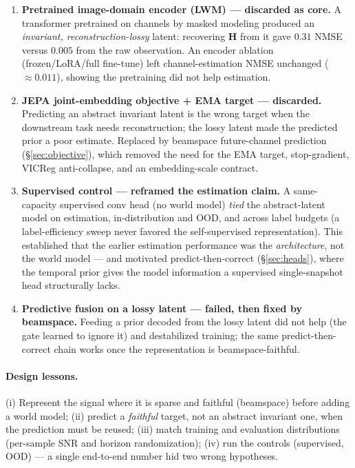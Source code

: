 \documentclass[11pt]{article}
\newcommand{\Hc}{\mathbf{H}}
\begin{document}
\begin{enumerate}[leftmargin=2em]
\item \textbf{Pretrained image-domain encoder (LWM) --- discarded as core.} A transformer pretrained
on channels by masked modeling produced an \emph{invariant, reconstruction-lossy} latent: recovering
$\Hc$ from it gave $0.31$ NMSE versus $0.005$ from the raw observation. An encoder ablation
(frozen/LoRA/full fine-tune) left channel-estimation NMSE unchanged ($\approx\!0.011$), showing the
pretraining did not help estimation.
\item \textbf{JEPA joint-embedding objective + EMA target --- discarded.} Predicting an abstract
invariant latent is the wrong target when the downstream task needs reconstruction; the lossy latent
made the predicted prior a poor estimate. Replaced by beamspace future-channel prediction
(\S\ref{sec:objective}), which removed the need for the EMA target, stop-gradient, VICReg
anti-collapse, and an embedding-scale contract.
\item \textbf{Supervised control --- reframed the estimation claim.} A same-capacity supervised conv
head (no world model) \emph{tied} the abstract-latent model on estimation, in-distribution and OOD,
and across label budgets (a label-efficiency sweep never favored the self-supervised representation).
This established that the earlier estimation performance was the \emph{architecture}, not the world
model --- and motivated predict-then-correct (\S\ref{sec:heads}), where the temporal prior gives the
model information a supervised single-snapshot head structurally lacks.
\item \textbf{Predictive fusion on a lossy latent --- failed, then fixed by beamspace.} Feeding a
prior decoded from the lossy latent did not help (the gate learned to ignore it) and destabilized
training; the same predict-then-correct chain works once the representation is beamspace-faithful.
\end{enumerate}

\paragraph{Design lessons.}
(i) Represent the signal where it is sparse and faithful (beamspace) before adding a world model;
(ii) predict a \emph{faithful} target, not an abstract invariant one, when the prediction must be
reused; (iii) match training and evaluation distributions (per-sample SNR and horizon randomization);
(iv) run the controls (supervised, OOD) --- a single end-to-end number hid two wrong hypotheses.
\end{document}
